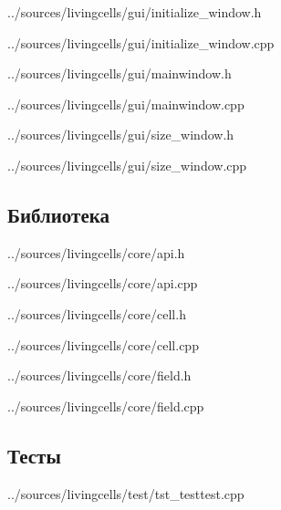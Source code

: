 \documentclass[a4paper]{article}
\begin{document}

{../sources/livingcells/gui/initialize_window.h}

{../sources/livingcells/gui/initialize_window.cpp}
\newpage


{../sources/livingcells/gui/mainwindow.h}

{../sources/livingcells/gui/mainwindow.cpp}
\newpage


{../sources/livingcells/gui/size_window.h}

{../sources/livingcells/gui/size_window.cpp}
\newpage

\subsection{Библиотека}


{../sources/livingcells/core/api.h}

{../sources/livingcells/core/api.cpp}
\newpage


{../sources/livingcells/core/cell.h}

{../sources/livingcells/core/cell.cpp}
\newpage


{../sources/livingcells/core/field.h}

{../sources/livingcells/core/field.cpp}
\newpage

\subsection{Тесты}


{../sources/livingcells/test/tst_testtest.cpp}
\newpage
\end{document}
